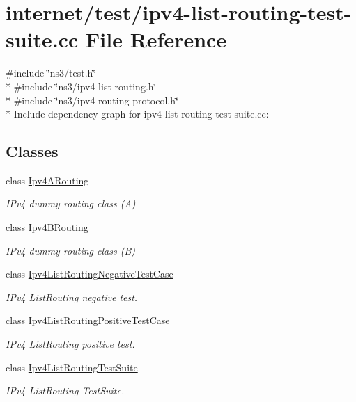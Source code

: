 \hypertarget{ipv4-list-routing-test-suite_8cc}{}\section{internet/test/ipv4-\/list-\/routing-\/test-\/suite.cc File Reference}
\label{ipv4-list-routing-test-suite_8cc}
{\ttfamily \#include \char`\"{}ns3/test.\+h\char`\"{}}\\*
{\ttfamily \#include \char`\"{}ns3/ipv4-\/list-\/routing.\+h\char`\"{}}\\*
{\ttfamily \#include \char`\"{}ns3/ipv4-\/routing-\/protocol.\+h\char`\"{}}\\*
Include dependency graph for ipv4-\/list-\/routing-\/test-\/suite.cc\+:
\subsection*{Classes}
\begin{DoxyCompactItemize}
\item 
class \hyperlink{classIpv4ARouting}{Ipv4\+A\+Routing}
\begin{DoxyCompactList}\small\item\em I\+Pv4 dummy routing class (A) \end{DoxyCompactList}\item 
class \hyperlink{classIpv4BRouting}{Ipv4\+B\+Routing}
\begin{DoxyCompactList}\small\item\em I\+Pv4 dummy routing class (B) \end{DoxyCompactList}\item 
class \hyperlink{classIpv4ListRoutingNegativeTestCase}{Ipv4\+List\+Routing\+Negative\+Test\+Case}
\begin{DoxyCompactList}\small\item\em I\+Pv4 List\+Routing negative test. \end{DoxyCompactList}\item 
class \hyperlink{classIpv4ListRoutingPositiveTestCase}{Ipv4\+List\+Routing\+Positive\+Test\+Case}
\begin{DoxyCompactList}\small\item\em I\+Pv4 List\+Routing positive test. \end{DoxyCompactList}\item 
class \hyperlink{classIpv4ListRoutingTestSuite}{Ipv4\+List\+Routing\+Test\+Suite}
\begin{DoxyCompactList}\small\item\em I\+Pv4 List\+Routing Test\+Suite. \end{DoxyCompactList}\end{DoxyCompactItemize}
